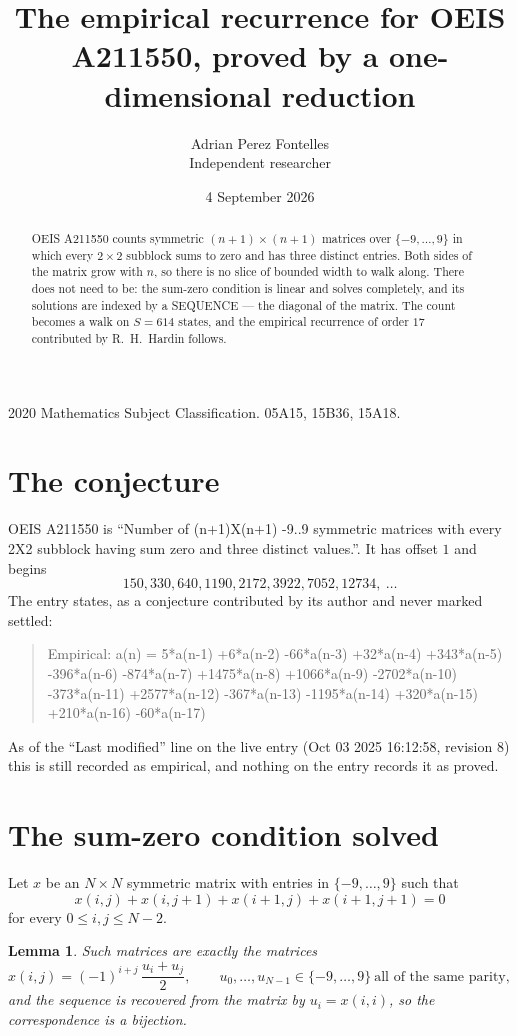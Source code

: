 \documentclass[11pt,a4paper]{article}
\title{The empirical recurrence for OEIS A211550, proved by a one-dimensional reduction}
\author{Adrian Perez Fontelles\\ \small Independent researcher}
\date{4 September 2026}
\theoremstyle{plain}
\newtheorem{lemma}[theorem]{Lemma}
\theoremstyle{definition}
\begin{document}
\maketitle

\begin{abstract}
OEIS A211550 counts symmetric $(n+1)\times(n+1)$ matrices over
$\{-9,\dots,9\}$ in which every $2\times2$ subblock sums to zero and has three distinct
entries. Both sides of the matrix grow with $n$, so there is no slice of bounded width to walk
along. There does not need to be: the sum-zero condition is linear and solves completely, and
its solutions are indexed by a SEQUENCE --- the diagonal of the matrix. The count becomes a walk
on $S=614$ states, and the empirical recurrence of order $17$ contributed by R.~H.~Hardin
follows.
\end{abstract}

\noindent\small 2020 Mathematics Subject Classification. 05A15, 15B36, 15A18.\normalsize

\section{The conjecture}

OEIS A211550 is ``Number of (n+1)X(n+1) -9..9 symmetric matrices with every 2X2 subblock having sum zero and three distinct values.''. It has offset $1$ and begins
\[
150, 330, 640, 1190, 2172, 3922, 7052, 12734,\ \dots
\]
The entry states, as a conjecture contributed by its author and never marked settled:
\begin{quote}
Empirical: a(n) = 5*a(n-1) +6*a(n-2) -66*a(n-3) +32*a(n-4) +343*a(n-5) -396*a(n-6) -874*a(n-7) +1475*a(n-8) +1066*a(n-9) -2702*a(n-10) -373*a(n-11) +2577*a(n-12) -367*a(n-13) -1195*a(n-14) +320*a(n-15) +210*a(n-16) -60*a(n-17)
\end{quote}
As of the ``Last modified'' line on the live entry (Oct 03 2025 16:12:58, revision 8) this is still
recorded as empirical, and nothing on the entry records it as proved.

\section{The sum-zero condition solved}

Let $x$ be an $N\times N$ symmetric matrix with entries in $\{-9,\dots,9\}$ such that
\[
x(i,j)+x(i,j{+}1)+x(i{+}1,j)+x(i{+}1,j{+}1)=0
\]
for every $0\le i,j\le N-2$.

\begin{lemma}\label{lem:solve}
Such matrices are exactly the matrices
\[
x(i,j)=(-1)^{i+j}\,\frac{u_i+u_j}{2},
\qquad u_0,\dots,u_{N-1}\in\{-9,\dots,9\}\ \text{all of the same parity},
\]
and the sequence is recovered from the matrix by $u_i=x(i,i)$, so the correspondence is a
bijection.
\end{lemma}
\end{document}
